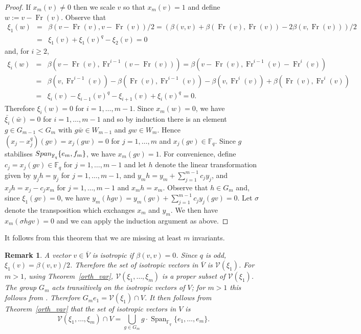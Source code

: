 \documentclass{amsart}
\newcommand{\field}{\mathbb{F}}
\newcommand{\V}{\mathcal{V}}
\newtheorem{remark}[subsection]{Remark}
\DeclareMathOperator{\Span}{Span}
\DeclareMathOperator{\Fr}{Fr}
\begin{document}
\begin{proof}
If $x_m(v)\not=0$ then we scale $v$ so that $x_m(v)=1$ and define $w:=v-\Fr(v)$.
Observe that
\begin{eqnarray*}
\xi_1(w)&=&
\beta(v-\Fr(v),v-\Fr(v))/2
=\left(\beta(v,v)+\beta(\Fr(v),\Fr(v))-2\beta(v,\Fr(v))\right)/2\\
   &=&\xi_1(v)+\xi_1(v)^q-\xi_2(v)=0
\end {eqnarray*}
and, for $i\geq2$,
\begin{eqnarray*}
\xi_{i}(w)&=&\beta(v-\Fr(v),\Fr^{i-1}(v-\Fr(v)))=\beta(v-\Fr(v),\Fr^{i-1}(v)-\Fr^{i}(v))\\
&=&\beta(v,\Fr^{i-1}(v))-\beta(\Fr(v),\Fr^{i-1}(v))-\beta(v,\Fr^{i}(v))+\beta(\Fr(v),\Fr^{i}(v))\\
   &=&\xi_{i}(v)-\xi_{i-1}(v)^q-\xi_{i+1}(v)+\xi_{i}(v)^q=0.
\end {eqnarray*}
Therefore $\xi_{i}(w)=0$ for $i=1,\ldots,m-1$.
Since $x_m(w)=0$,
we have $\bar{\xi_{i}}(\bar{w})=0$ for $i=1,\ldots, m-1$ and so by induction
there is an element $g\in G_{m-1}<G_m$
with $g\bar{w}\in W_{m-1}$ and $gw\in W_m$.
Hence $(x_j-x_j^q)(gv)=x_j(gw)=0$ for $j=1,\ldots,m$ and $x_j(gv)\in\field_q$.
Since $g$ stabilises ${\rm Span}_{\field_q}\{e_m,f_m\}$, we have $x_m(gv)=1$.
For convenience, define $c_j=x_j(gv)\in\field_q$ for $j=1,\ldots,m-1$ and
let $h$ denote the linear transformation
given by $y_jh=y_j$ for $j=1,\ldots,m-1$, 
and $y_mh=y_m+\sum_{j=1}^{m-1} c_jy_j$, and $x_jh=x_j-c_jx_m$ for $j=1,\ldots,m-1$
and $x_mh=x_m$. Observe that $h\in G_m$
and, since  $\xi_1(gv)=0$, we have $y_m(hgv)=y_m(gv)+\sum_{j=1}^{m-1} c_jy_j(gv)=0$.
Let $\sigma $ denote the transposition which exchanges $x_m$ and $y_m$. We then have
$x_m(\sigma h g v)=0$ and we can apply the induction argument as above.
\end{proof}

It follows from this theorem that we are missing at least $m$ invariants.

\begin{remark} A vector $v\in\overline{V}$ is isotropic if $\beta(v,v)=0$.
Since $q$ is odd, $\xi_1(v)=\beta(v,v)/2$. Therefore the set of isotropic vectors
in $\overline{V}$ is $\V(\xi_1)$. For $m>1$, using Theorem~\ref{orth_var}, 
$\V(\xi_1,\ldots,\xi_m)$ is a proper subset of $\V(\xi_1)$.
The group $G_m$ acts transitively on the isotropic vectors of $V$;
for $m>1$ this follows from \cite[Lemma 11.27]{taylor-classicalgroups:92}.
Therefore $G_me_1=\V(\xi_1)\cap V$. It then follows from Theorem~\ref{orth_var}
that the set of isotropic vectors in $V$ is
$$\V(\xi_1,\ldots,\xi_m)\cap V=\bigcup_{g\in G_m}
g\cdot\Span_{{\field}_q}\{e_1,\ldots,e_m\}.$$
\end{remark}
\end{document}

